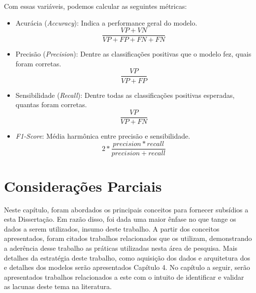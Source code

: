 Com essas variáveis, podemos calcular as seguintes métricas:

\begin{itemize}
    \item Acurácia (\textit{Accuracy}): Indica a performance geral do modelo.
        \begin{equation}
        \frac{VP + VN}{VP+FP+FN+FN}
        \end{equation}
    \item Precisão (\textit{Precision}): Dentre as classificações positivas que o modelo fez, quais foram corretas.
        \begin{equation}
        \frac{VP}{VP+FP}
        \end{equation}
    \item Sensibilidade (\textit{Recall}): Dentre todas as classificações positivas esperadas, quantas foram corretas.
        \begin{equation}
        \frac{VP}{VP+FN}
        \end{equation}
    \item \textit{F1-Score}: Média harmônica entre precisão e sensibilidade.
        \begin{equation}
        2 * \frac{precision  * recall}{precision + recall}
        \end{equation}
\end{itemize}

\section{Considerações Parciais}

Neste capítulo, foram abordados os principais conceitos para fornecer subsídios a esta Dissertação. Em razão disso, foi dada uma maior ênfase no que tange os dados a serem utilizados, insumo deste trabalho. A partir dos conceitos apresentados, foram citados trabalhos relacionados que os utilizam, demonstrando a aderência desse trabalho as práticas utilizadas nesta área de pesquisa. Mais detalhes da estratégia deste trabalho, como aquisição dos dados e arquitetura dos e detalhes dos modelos serão apresentados Capítulo 4. No capítulo a seguir, serão apresentados trabalhos relacionados a este com o intuito de identificar e validar as lacunas deste tema na literatura. 

